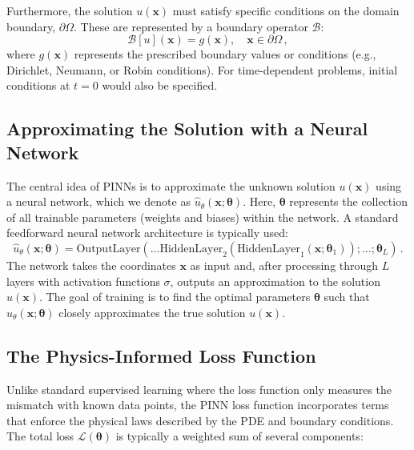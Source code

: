 Furthermore, the solution $u(\mathbf{x})$ must satisfy specific conditions on the domain boundary, $\partial\Omega$. These are represented by a boundary operator $\mathcal{B}$:
%
\begin{equation}
\mathcal{B}[u](\mathbf{x}) = g(\mathbf{x}), \quad \mathbf{x} \in \partial\Omega \,,
\label{eq:bc_general}
\end{equation}
%
where $g(\mathbf{x})$ represents the prescribed boundary values or conditions (e.g., Dirichlet, Neumann, or Robin conditions). 
For time-dependent problems, initial conditions at $t=0$ would also be specified.

\subsection{Approximating the Solution with a Neural Network}

The central idea of PINNs is to approximate the unknown solution $u(\mathbf{x})$ using a neural network, which we denote as $\hat{u}_\theta(\mathbf{x}; \boldsymbol{\theta})$. 
Here, $\boldsymbol{\theta}$ represents the collection of all trainable parameters (weights and biases) within the network. A standard feedforward neural network architecture is typically used:
%
\begin{equation*}
\hat{u}_\theta(\mathbf{x}; \boldsymbol{\theta}) = \text{OutputLayer}(\dots \text{HiddenLayer}_2(\text{HiddenLayer}_1(\mathbf{x}; \boldsymbol{\theta}_1)); \dots ; \boldsymbol{\theta}_L)\,.
\end{equation*}
%
The network takes the coordinates $\mathbf{x}$ as input and, after processing through $L$ layers with activation functions $\sigma$, outputs an approximation to the solution $u(\mathbf{x})$. The goal of training is to find the optimal parameters $\boldsymbol{\theta}$ such that $\hat{u}_\theta(\mathbf{x}; \boldsymbol{\theta})$ closely approximates the true solution $u(\mathbf{x})$.

\subsection{The Physics-Informed Loss Function}

Unlike standard supervised learning where the loss function only measures the mismatch with known data points, the PINN loss function incorporates terms that enforce the physical laws described by the PDE and boundary conditions. The total loss $\mathcal{L}(\boldsymbol{\theta})$ is typically a weighted sum of several components:

